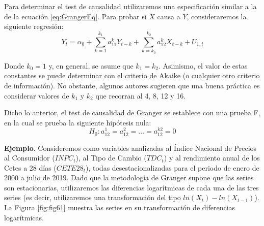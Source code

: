 \documentclass[
]{book}
\begin{document}
Para determinar el test de causalidad utilizaremos una especificación similar a la de la ecuación \eqref{eq:GrangerEq}. Para probar si \(X\) causa a \(Y\), consideraremos la siguiente regresión:
\begin{equation}
    Y_t = \alpha_0 + \sum^{k_1}_{k = 1} a^k_{11} Y_{t-k} + \sum^{k_2}_{k = k_0} a^k_{12} X_{t-k} + U_{1,t}
\end{equation}

Donde \(k_0 = 1\) y, en general, se asume que \(k_1 = k_2\). Asimismo, el valor de estas constantes se puede determinar con el criterio de Akaike (o cualquier otro criterio de información). No obstante, algunos autores sugieren que una buena práctica es considerar valores de \(k_1\) y \(k_2\) que recorran al 4, 8, 12 y 16.

Dicho lo anterior, el test de causalidad de Granger se establece con una prueba F, en la cual se prueba la siguiente hipótesis nula:
\begin{equation}
    H_0: a^1_{12} = a^2_{12} = \ldots = a^{k2}_{12} = 0
\end{equation}

\textbf{Ejemplo}. Consideremos como variables analizadas al Índice Nacional de Precios al Consumidor (\(INPC_t\)), al Tipo de Cambio (\(TDC_t\)) y al rendimiento anual de los Cetes a 28 días (\(CETE28_t\)), todas desestacionalizadas para el periodo de enero de 2000 a julio de 2019. Dado que la metodología de Granger supone que las series son estacionarias, utilizaremos las diferencias logarítmicas de cada una de las tres series (es decir, utilizaremos una transformación del tipo \(ln(X_t) - ln(X_{t-1})\)). La Figura \ref{fig:fig61} muestra las series en su transformación de diferencias logarítmicas.
\end{document}
